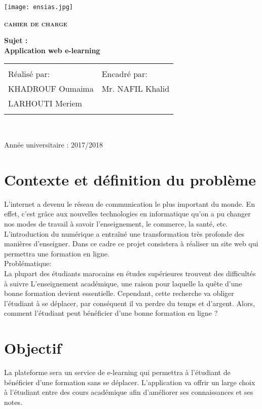 \documentclass{report}
\begin{document}
\thispagestyle{empty} 
\texttt{[image: ensias.jpg]}\\\vfill 
\begin{center}
\Huge \textsc\textbf{cahier de charge}\\\vfill

\textbf{Sujet :\\ Application web e-learning}\normalsize \\\vfill
                                                                  
\begin{tabular}{ll}
\hline\hline\\
Réalisé par: & Encadré par:\\
KHADROUF Oumaima & Mr. NAFIL Khalid\\ 
LARHOUTI Meriem\\
\hline\hline\\                                     
\end{tabular}\\\vfill
\end{center}      


Année universitaire : 2017/2018

\newpage
\tableofcontents
\newpage
\section{Contexte et définition du problème}
L'internet a devenu le réseau de communication le plus important du monde. En effet, c'est grâce aux nouvelles technologies en informatique qu'on a pu changer nos modes de travail à savoir l'enseignement, le commerce, la santé, etc.\\
L'introduction du numérique a entraîné une transformation très profonde des manières d'enseigner. Dans ce cadre ce projet consistera à réaliser un site web qui permettra une formation en ligne.\\
Problématique:\\
La plupart des étudiants marocains en études supérieures trouvent des difficultés à suivre L'enseignement académique, une raison pour laquelle la quête d'une bonne formation devient essentielle. Cependant, cette recherche va obliger l'étudiant à se déplacer, par conséquent il va perdre du temps et d'argent. Alors, comment l'étudiant peut bénéficier d'une bonne formation en ligne ? 
 
\section{Objectif}
La plateforme sera un service de e-learning qui permettra à l'étudiant de bénéficier d'une formation sans se déplacer. L'application va offrir un large choix à l'étudiant entre des cours académique afin d'améliorer ses connaissances et ses notes. 
\end{document}
